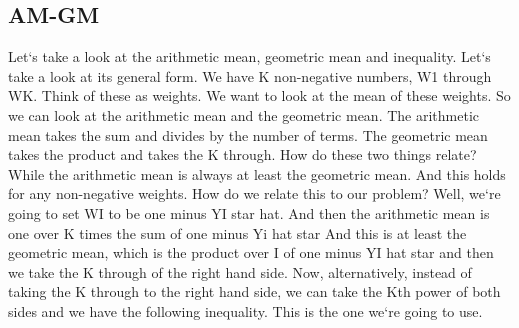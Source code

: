 \subsection{AM-GM}
Let`s take a look at the arithmetic mean, geometric mean and inequality.
Let`s take a look at its general form.
We have K non-negative numbers, W1 through WK\@.
Think of these as weights.
We want to look at the mean of these weights.
So we can look at the arithmetic mean and the geometric mean.
The arithmetic mean takes the sum and divides by the number of terms.
The geometric mean takes the product and takes the K through.
How do these two things relate? While the arithmetic mean is always at least the geometric mean.
And this holds for any non-negative weights.
How do we relate this to our problem? Well, we`re going to set WI to be one minus YI star hat.
And then the arithmetic mean is one over K times the sum of one minus Yi hat star And this is at least the geometric mean, which is the product over I of one minus YI hat star and then we take the K through of the right hand side.
Now, alternatively, instead of taking the K through to the right hand side, we can take the Kth power of both sides and we have the following inequality.
This is the one we`re going to use.

